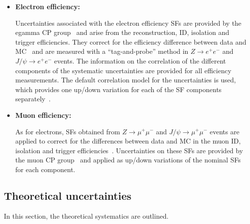 \begin{itemize}
\item \textbf{Electron efficiency:}

Uncertainties associated with the electron efficiency SFs are provided by the egamma CP group~\cite{twiki-elSF} and arise from the reconstruction,
ID, isolation and trigger efficiencies. They correct for the efficiency difference between data and MC~\cite{EGAM-2018-01}
and are measured with a ``tag-and-probe'' method in $Z\rightarrow e^{+}e^{-}$ and $J/\psi \rightarrow e^{+}e^{-}$ events. The information on the correlation of the different components of the systematic
uncertainties are provided for all efficiency  measurements. The default correlation model for the uncertainties is used, which provides one up/down variation
for each of the SF components separately~\cite{twiki-elSF,twiki-elSFunc}.


\item \textbf{Muon efficiency:}

As for electrons, SFs obtained from $Z\rightarrow \mu^{+}\mu^{-}$ and $J/\psi \rightarrow \mu^{+}\mu^{-}$ events are applied to correct for the differences between data and MC in the muon ID,
isolation and trigger efficiencies~\cite{MUON-2018-03}. Uncertainties on these SFs are provided by the muon
CP group~\cite{twiki-muSF} and applied as up/down variations of the nominal SFs for each component.


\end{itemize}

\subsection{Theoretical uncertainties}
\label{subsec:syst_theory}

In this section, the theoretical systematics are outlined.

